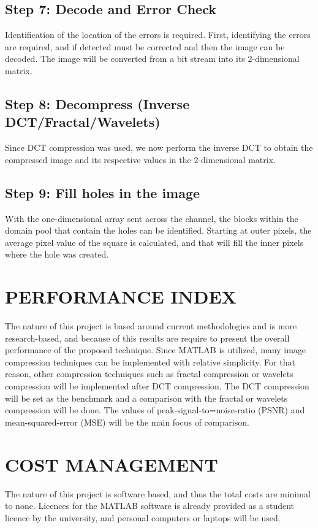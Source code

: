 \documentclass[10pt,twocolumn, a4paper]{witseiepaper}
\begin{document}
\subsection{Step 7: Decode and Error Check}
\label{sec: Step 7}
Identification of the location of the errors is required. First, identifying the errors are required, and if detected must be corrected and then the image can be decoded. The image will be converted from a bit stream into its 2-dimensional matrix.

\subsection{Step 8: Decompress (Inverse DCT/Fractal/Wavelets)}
\label{sec: Step 8}
Since DCT compression was used, we now perform the inverse DCT to obtain the compressed image and its respective values in the 2-dimensional matrix.

\subsection{Step 9: Fill holes in the image}
\label{sec: Step 9}
With the one-dimensional array sent across the channel, the blocks within the domain pool that contain the holes can be identified. Starting at outer pixels, the average pixel value of the square is calculated, and that will fill the inner pixels where the hole was created.

%
\section{PERFORMANCE INDEX}
\label{sec: Performance Index}
The nature of this project is based around current methodologies and is more research-based, and because of this results are require to present the overall performance of the proposed technique. Since MATLAB is utilized, many image compression techniques can be implemented with relative simplicity. For that reason, other compression techniques such as fractal compression or wavelets compression will be implemented after DCT compression. The DCT compression will be set as the benchmark and a comparison with the fractal or wavelets compression will be done. The values of peak-signal-to=noise-ratio (PSNR) and mean-squared-error (MSE) will be the main focus of comparison.

%
\section{COST MANAGEMENT}
\label{sec: Cost Management}
The nature of this project is software based, and thus the total costs are minimal to none. Licences for the MATLAB software is already provided as a student licence by the university, and personal computers or laptops will be used.
\end{document}

